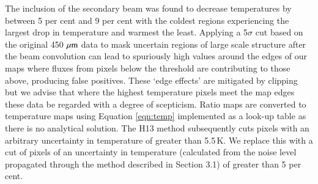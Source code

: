 \begin{figure(}
The inclusion of the secondary beam was found to decrease temperatures by between 5 per cent and 
9 per cent with the coldest regions experiencing the largest drop in temperature and warmest the least. 
Applying a 5$\sigma$ cut based on the original 450\,$\,\mu\rm{m}$ data to mask uncertain regions of 
large scale structure after the beam convolution can lead to spuriously high values around the 
edges of our maps where fluxes from pixels below the threshold are contributing to those above, 
producing false positives. These `edge effects' are mitigated by clipping but we advise that 
where the highest temperature pixels meet the map edges these data be regarded with a degree of scepticism. 
Ratio maps are converted to temperature maps using Equation \ref{eqn:temp} 
implemented as a look-up table as there is no analytical solution. The H13 method 
subsequently cuts pixels with an arbitrary uncertainty in temperature of greater 
than 5.5\,K. We replace this with a cut of pixels of an uncertainty in temperature 
(calculated from the noise level propagated through the method described in 
Section 3.1) of greater than 5 per cent. 


\end{figure(}
